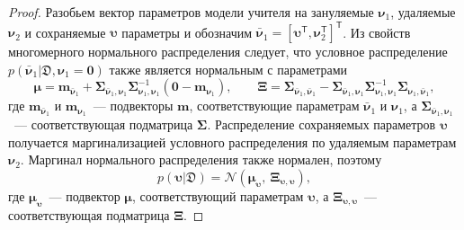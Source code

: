 \begin{proof}
Разобьем вектор параметров модели учителя на зануляемые $\boldsymbol{\nu}_1$, удаляемые $\boldsymbol{\nu}_2$ и сохраняемые $\boldsymbol{\upsilon}$ параметры и обозначим $\bar{\boldsymbol{\nu}}_1=[\boldsymbol{\upsilon}^{\mathsf{T}},\boldsymbol{\nu}_2^{\mathsf{T}}]^{\mathsf{T}}$. Из свойств многомерного нормального распределения следует, что условное распределение $p(\bar{\boldsymbol{\nu}}_1|\mathfrak{D},\boldsymbol{\nu}_1=\mathbf{0})$ также является нормальным с параметрами
\[
    \boldsymbol{\mu}
    =
    \mathbf{m}_{\bar{\boldsymbol{\nu}}_1}
    +
    \boldsymbol{\Sigma}_{\bar{\boldsymbol{\nu}}_1,\boldsymbol{\nu}_1}
    \boldsymbol{\Sigma}_{\boldsymbol{\nu}_1,\boldsymbol{\nu}_1}^{-1}
    (\mathbf{0}-\mathbf{m}_{\boldsymbol{\nu}_1}),
    \qquad
    \boldsymbol{\Xi}
    =
    \boldsymbol{\Sigma}_{\bar{\boldsymbol{\nu}}_1,\bar{\boldsymbol{\nu}}_1}
    -
    \boldsymbol{\Sigma}_{\bar{\boldsymbol{\nu}}_1,\boldsymbol{\nu}_1}
    \boldsymbol{\Sigma}_{\boldsymbol{\nu}_1,\boldsymbol{\nu}_1}^{-1}
    \boldsymbol{\Sigma}_{\boldsymbol{\nu}_1,\bar{\boldsymbol{\nu}}_1},
\]
где $\mathbf{m}_{\bar{\boldsymbol{\nu}}_1}$ и $\mathbf{m}_{\boldsymbol{\nu}_1}$~--- подвекторы $\mathbf{m}$, соответствующие параметрам $\bar{\boldsymbol{\nu}}_1$ и $\boldsymbol{\nu}_1$, а $\boldsymbol{\Sigma}_{\bar{\boldsymbol{\nu}}_1,\boldsymbol{\nu}_1}$~--- соответствующая подматрица $\boldsymbol{\Sigma}$.
Распределение сохраняемых параметров $\boldsymbol{\upsilon}$ получается маргинализацией условного распределения по удаляемым параметрам $\boldsymbol{\nu}_2$. Маргинал нормального распределения также нормален, поэтому
\[
    p(\boldsymbol{\upsilon}|\mathfrak{D})=\mathcal{N}(\boldsymbol{\mu}_{\boldsymbol{\upsilon}},\ \boldsymbol{\Xi}_{\boldsymbol{\upsilon},\boldsymbol{\upsilon}}),
\]
где $\boldsymbol{\mu}_{\boldsymbol{\upsilon}}$~--- подвектор $\boldsymbol{\mu}$, соответствующий параметрам $\boldsymbol{\upsilon}$, а $\boldsymbol{\Xi}_{\boldsymbol{\upsilon},\boldsymbol{\upsilon}}$~--- соответствующая подматрица $\boldsymbol{\Xi}$.
\end{proof}

